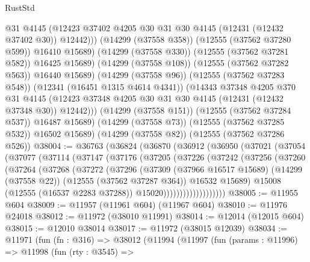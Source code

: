 \begin{lexlean}{RustStd}
\begin{coremodule}
                    @31
                    @4145
                    (@12423 @37402 @4205 @30 @31 @30 @4145 (@12431 (@12432 @37402 @30)) @12442)))
                (@14299 (@37558 @358))
                (@12555 (@37562 @37280 @599))
                @16410
                @15689)
              (@14299 (@37558 @330))
              (@12555 (@37562 @37281 @582))
              @16425
              @15689)
            (@14299 (@37558 @108))
            (@12555 (@37562 @37282 @563))
            @16440
            @15689)
          (@14299 (@37558 @96))
          (@12555 (@37562 @37283 @548))
          (@12341 (@16451 @1315 @4614 @4341))
          (@14343
            @37348
            @4205
            @370
            @31
            @4145
            (@12423 @37348 @4205 @30 @31 @30 @4145 (@12431 (@12432 @37348 @30)) @12442)))
        (@14299 (@37558 @151))
        (@12555 (@37562 @37284 @537))
        @16487
        @15689)
      (@14299 (@37558 @73))
      (@12555 (@37562 @37285 @532))
      @16502
      @15689)
    (@14299 (@37558 @82))
    (@12555 (@37562 @37286 @526))
@38004 := @36763
    (@36824
      (@36870
        (@36912
          (@36950
            (@37021
              (@37054
                (@37077
                  (@37114
                    (@37147
                      (@37176
                        (@37205
                          (@37226
                            (@37242
                              (@37256
                                (@37260
                                  (@37264
                                    (@37268
                                      (@37272
                                        (@37296
                                          (@37309
                                            (@37966 @16517 @15689)
                                            (@14299 (@37558 @22))
                                            (@12555 (@37562 @37287 @364))
                                            @16532
                                            @15689)
                                          @15008
                                          (@12555 (@16537 @2283 @37288))
                                          @15020)))))))))))))))))))
@38005 := @11955 @604
@38009 := @11957 (@11961 @604) (@11967 @604)
@38010 := @11976 @24018
@38012 := @11972 (@38010 @11991)
@38014 := @12014 (@12015 @604)
@38015 := @12010 @38014
@38017 := @11972 (@38015 @12039)
@38034 := @11971
    (fun (fn : @316) =>
    @38012
      (@11994
        (@11997
          (fun (params : @11996) =>
          @11998
            (fun (rty : @3545) =>

\end{coremodule}
\end{lexlean}
